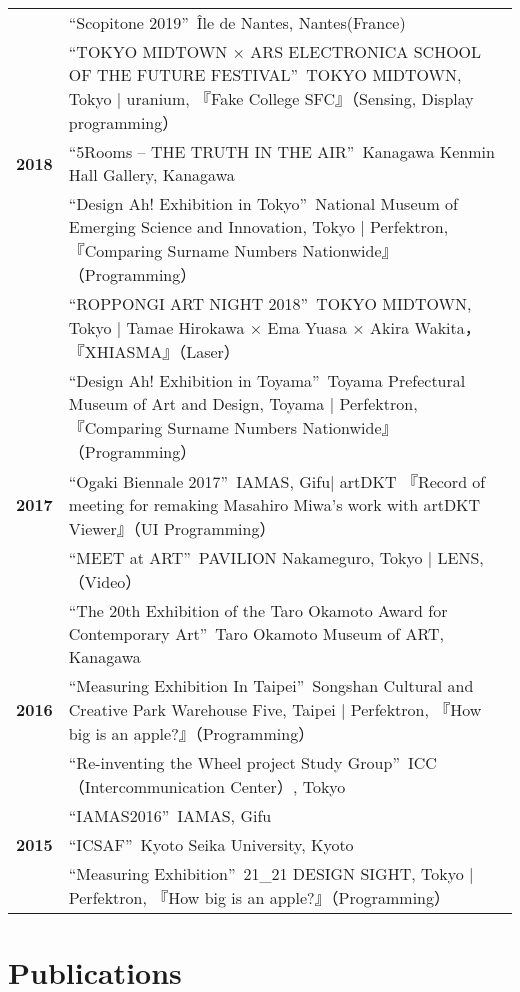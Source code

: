 \documentclass[8pt,a4paper]{article}
\begin{document}
\begin{longtable}{@{}p{1.2cm}@{\hspace{0.5cm}}p{14cm}@{}}
& ``Scopitone 2019''\, Île de Nantes, Nantes(France) \\
& ``TOKYO MIDTOWN × ARS ELECTRONICA SCHOOL OF THE FUTURE FESTIVAL''\, TOKYO MIDTOWN, Tokyo | uranium, 『Fake College SFC』（Sensing, Display programming） \\[0.2em]
\textbf{2018} & ``5Rooms – THE TRUTH IN THE AIR''\, Kanagawa Kenmin Hall Gallery, Kanagawa \\
& ``Design Ah! Exhibition in Tokyo''\, National Museum of Emerging Science and Innovation, Tokyo | Perfektron, 『Comparing Surname Numbers Nationwide』（Programming） \\
& ``ROPPONGI ART NIGHT 2018''\, TOKYO MIDTOWN, Tokyo | Tamae Hirokawa × Ema Yuasa × Akira Wakita，『XHIASMA』（Laser） \\
& ``Design Ah! Exhibition in Toyama''\, Toyama Prefectural Museum of Art and Design, Toyama | Perfektron, 『Comparing Surname Numbers Nationwide』（Programming） \\[0.2em]
\textbf{2017} & ``Ogaki Biennale 2017''\, IAMAS, Gifu| artDKT 『Record of meeting for remaking Masahiro Miwa's work with artDKT Viewer』（UI Programming） \\
& ``MEET at ART''\, PAVILION Nakameguro, Tokyo | LENS, （Video） \\
& ``The 20th Exhibition of the Taro Okamoto Award for Contemporary Art''\, Taro Okamoto Museum of ART, Kanagawa \\[0.2em]
\textbf{2016} & ``Measuring Exhibition In Taipei''\, Songshan Cultural and Creative Park Warehouse Five, Taipei | Perfektron, 『How big is an apple?』（Programming） \\
& ``Re-inventing the Wheel project Study Group''\, ICC（Intercommunication Center）, Tokyo \\
& ``IAMAS2016''\, IAMAS, Gifu \\[0.2em]
\textbf{2015} & ``ICSAF''\, Kyoto Seika University, Kyoto \\
& ``Measuring Exhibition''\, 21\_21 DESIGN SIGHT, Tokyo | Perfektron, 『How big is an apple?』（Programming） \\
\end{longtable}

\section*{Publications}
\end{document}
